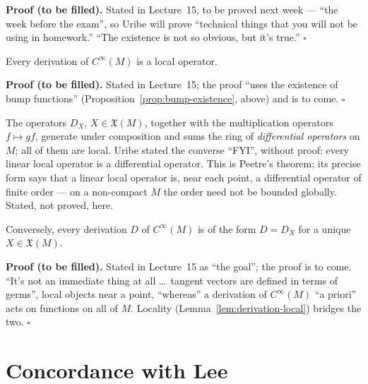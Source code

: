 \documentclass[11pt]{report}
\makeatletter
\newcounter{thmcounter}[section]
\renewenvironment{proof}[1][Proof]{\noindent\textbf{#1.} }{\hfill$\square$\par\vspace{5pt}}
\newcommand{\thmlabel}[1]{\edef\@currentlabel{\arabic{section}.\arabic{thmcounter}}\label{#1}}
\newcommand{\leeref}[1]{\par\smallskip{\raggedleft\footnotesize\textsc{Lee}:\ #1\par}}
\makeatother
\begin{document}
\begin{proof}[Proof (to be filled)]
Stated in Lecture~15, to be proved next week --- ``the week before the exam'', so Uribe will prove ``technical things that you will not be using in homework.'' ``The existence is not so obvious, but it's true.''
\end{proof}

\begin{lembox}\thmlabel{lem:derivation-local}
Every derivation of $C^\infty(M)$ is a local operator.
\end{lembox}

\begin{proof}[Proof (to be filled)]
Stated in Lecture~15; the proof ``uses the existence of bump functions'' (Proposition~\ref{prop:bump-existence}, above) and is to come.
\end{proof}

\begin{rembox}\label{rem:differential-operators}
The operators $D_X$, $X \in \mathfrak{X}(M)$, together with the multiplication operators $f \mapsto gf$, generate under composition and sums the ring of \emph{differential operators} on $M$; all of them are local. Uribe stated the converse ``FYI'', without proof: every linear local operator is a differential operator. This is Peetre's theorem; its precise form says that a linear local operator is, near each point, a differential operator of finite order --- on a non-compact $M$ the order need not be bounded globally. Stated, not proved, here.
\end{rembox}

\begin{propbox}\thmlabel{prop:derivations-are-fields}
Conversely, every derivation $D$ of $C^\infty(M)$ is of the form $D = D_X$ for a unique $X \in \mathfrak{X}(M)$.
\leeref{Proposition 8.15}
\end{propbox}

\begin{proof}[Proof (to be filled)]
Stated in Lecture~15 as ``the goal''; the proof is to come. ``It's not an immediate thing at all \ldots\ tangent vectors are defined in terms of germs'', local objects near a point, ``whereas'' a derivation of $C^\infty(M)$ ``a priori'' acts on functions on all of $M$. Locality (Lemma~\ref{lem:derivation-local}) bridges the two.
\end{proof}


\appendix
\chapter{Concordance with Lee}\label{app:lee}
\end{document}
